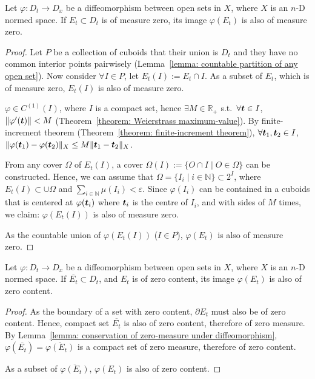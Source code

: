 \documentclass[openany]{book}
\begin{document}
\begin{lemma}
	\label{lemma: conservation of zero-measure under diffeomorphism}
	Let $\varphi \colon D_t \to D_x$ be a diffeomorphism between open sets in $X$, where $X$ is an $n$-D normed space.
	If $E_t \subset D_t$ is of measure zero, its image $\varphi(E_t)$ is also of measure zero.
\end{lemma}
\begin{proof}
	Let $P$ be a collection of cuboids that their union is $D_t$ and they have no common interior points pairwisely (Lemma~\ref{lemma: countable partition of any open set}). 
	Now consider $\forall I \in P$, let $E_t(I) := E_t \cap I$. 
	As a subset of $E_t$, which is of measure zero, $E_t(I)$ is also of measure zero.

	$\varphi \in C^{(1)}(I)$, where $I$ is a compact set, hence $\exists M \in \mathbb R_+$ s.t.\ $\forall \boldsymbol{t} \in I$, $\|\varphi'(\boldsymbol{t})\| < M$ (Theorem~\ref{theorem: Weierstrass maximum-value}). 
	By finite-increment theorem (Theorem~\ref{theorem: finite-increment theorem}), $\forall \boldsymbol{t}_1, \boldsymbol{t}_2 \in I$, $\|\varphi(\boldsymbol{t}_1) - \varphi(\boldsymbol{t}_2)\|_X \leq M\|\boldsymbol{t}_1 - \boldsymbol{t}_2\|_X$.

	From any cover $\varOmega$ of $E_t(I)$, a cover $\varOmega(I) := \{O \cap I \mid O \in \varOmega \}$ can be constructed. 
	Hence, we can assume that $\varOmega = \{I_i \mid i \in \mathbb N\} \subset 2^I$, where $E_t(I) \subset \cup \varOmega$ and $\sum_{i \in \mathbb N} \mu(I_i) < \varepsilon$. 
	Since $\varphi(I_i)$ can be contained in a cuboids that is centered at $\varphi(\boldsymbol{t}_i)$ where $\boldsymbol{t}_i$ is the centre of $I_i$, and with sides of $M$ times, we claim: $\varphi(E_t(I))$ is also of measure zero.
	
	As the countable union of $\varphi(E_t(I))$ ($I \in P$), $\varphi(E_t)$ is also of measure zero.
\end{proof}

\begin{lemma}
	\label{lemma: conservation of zero-content under diffeomorphism}
	Let $\varphi \colon D_t \to D_x$ be a diffeomorphism between open sets in $X$, where $X$ is an $n$-D normed space.
	If $\overline{E_t} \subset D_t$, and $E_t$ is of zero content, its image $\varphi(E_t)$ is also of zero content.
\end{lemma}
\begin{proof}
	As the boundary of a set with zero content, $\partial E_t$ must also be of zero content. 
	Hence, compact set $\overline{E_t}$ is also of zero content, therefore of zero measure.  
	By Lemma~\ref{lemma: conservation of zero-measure under diffeomorphism}, $\varphi(\overline{E_t}) = \overline{\varphi(E_t)}$ is a compact set of zero measure, therefore of zero content.

	As a subset of $\overline{\varphi(E_t)}$, $\varphi(E_t)$ is also of zero content.
\end{proof}
\end{document}
